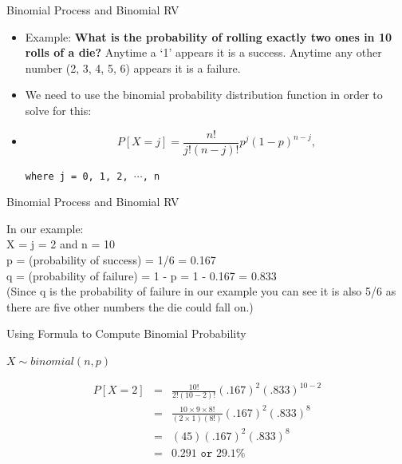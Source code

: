\documentclass[14pt]{beamer}\usepackage[]{graphicx}\usepackage[]{color}
\begin{document}
\begin{frame}[fragile]{Binomial Process and Binomial RV}

\begin{itemize}
\item<1-> Example: \textbf{What is the probability of rolling exactly two ones in 10  rolls of a die?}  Anytime a `1' appears it is a success.  Anytime any other number  (2, 3, 4, 5, 6) appears it is a failure.
\item<2-> We need to use the binomial probability distribution  function in order to solve for this:
\item<3->
\begin{equation*}
P[ X = j] = \frac{n!}{j! (n - j)!} p^j (1 - p)^{n - j}, 
\end{equation*}

\texttt{where j = 0, 1, 2, $\cdots$, n}
\end{itemize}
\end{frame}

\begin{frame}[fragile]{Binomial Process and Binomial RV}

In our example: \\
X = j = 2 and  n = 10 \\
p = (probability of success) = 1/6 = 0.167 \\
q = (probability of failure) = 1 - p = 1 - 0.167 = 0.833 \\
(Since q is the probability of failure in our example you can see it is also 5/6 as there are five other numbers the die could fall on.)
\end{frame}

\begin{frame}[fragile]{Using Formula to Compute Binomial Probability}

$X \sim binomial(n, p)$

\begin{eqnarray*}
P[X = 2] &=& \frac{10!}{2! (10 - 2)!} (.167)^2 (.833)^{10-2} \\
   &=& \frac{ 10 \times 9 \times 8!}{ (2 \times 1) (8!)} (.167)^2 (.833)^{8} \\
   &=& (45)(.167)^2 (.833)^{8} \\
   &=& 0.291 \texttt{ or } 29.1\%
\end{eqnarray*}

\end{frame}
\end{document}

